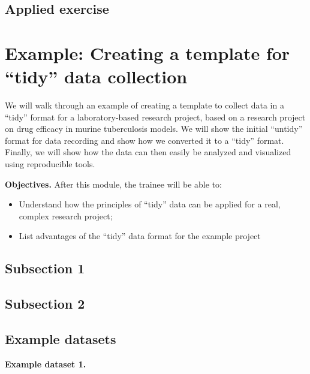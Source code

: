 \documentclass[]{tufte-book}
\providecommand{\tightlist}{%
  \setlength{\itemsep}{0pt}\setlength{\parskip}{0pt}}
\begin{document}
\hypertarget{applied-exercise-1}{%
\subsection{Applied exercise}\label{applied-exercise-1}}

\hypertarget{example-creating-a-template-for-tidy-data-collection}{%
\section{Example: Creating a template for ``tidy'' data collection}\label{example-creating-a-template-for-tidy-data-collection}}

We will walk through an example of creating a template to collect data in a
``tidy'' format for a laboratory-based research project, based on a research
project on drug efficacy in murine tuberculosis models. We will show the initial
``untidy'' format for data recording and show how we converted it to a ``tidy''
format. Finally, we will show how the data can then easily be analyzed and
visualized using reproducible tools.

\textbf{Objectives.} After this module, the trainee will be able to:

\begin{itemize}
\tightlist
\item
  Understand how the principles of ``tidy'' data can be applied for a real, complex research project;
\item
  List advantages of the ``tidy'' data format for the example project
\end{itemize}

\hypertarget{subsection-1-1}{%
\subsection{Subsection 1}\label{subsection-1-1}}

\hypertarget{subsection-2}{%
\subsection{Subsection 2}\label{subsection-2}}

\hypertarget{example-datasets}{%
\subsection{Example datasets}\label{example-datasets}}

\textbf{Example dataset 1.}
\end{document}
